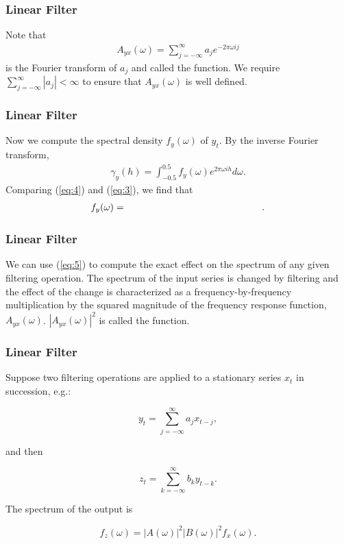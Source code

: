 \documentclass[%
xcolor=pdftex]{beamer}
\begin{document}
\begin{frame}
\frametitle{Linear Filter}

Note that
\begin{eqnarray} \label{eq:res}
A_{yx}(\omega) = \sum^\infty_{j=-\infty} a_j e^{-2\pi \omega i j}
\end{eqnarray}
is the Fourier transform of $a_j$ and called the \underline{\hspace{35 mm}} function. We require $\sum^\infty_{j=-\infty}|a_j|<\infty$ to ensure that
$A_{yx}(\omega)$ is well defined.

\end{frame}

\begin{frame}
\frametitle{Linear Filter}

Now we compute the spectral density $f_y(\omega)$ of $y_t$. By
the inverse Fourier transform,
\begin{eqnarray}\label{eq:4}
\gamma_y(h)  = \int^{0.5}_{-0.5} f_y(\omega) e^{2\pi \omega i h}d\omega.
\end{eqnarray}
Comparing (\ref{eq:4}) and (\ref{eq:3}), we find that
\begin{eqnarray}\label{eq:5}
f_y(\omega)  =  \hspace{50mm}.
\end{eqnarray}


\end{frame}

\begin{frame}
\frametitle{Linear Filter}

We can use (\ref{eq:5}) to compute the exact effect on the spectrum of any given filtering operation. The spectrum of the input series is changed by filtering and the effect of the change is characterized as a frequency-by-frequency multiplication by the squared magnitude of the frequency response function, $A_{yx}(\omega)$. $|A_{yx}(\omega)|^2$ is called the \underline{\hspace{25 mm}} function.

\end{frame}

\begin{frame}
\frametitle{Linear Filter}

Suppose two filtering operations are applied to a stationary series $x_t$ in succession, e.g.:

$$
y_t = \sum_{j=-\infty}^{\infty} a_j x_{t-j},
$$

and then

$$
z_t = \sum_{k=-\infty}^{\infty} b_k y_{t-k}.
$$

The spectrum of the output is

$$
f_z(\omega) = |A(\omega)|^2 |B(\omega)|^2 f_x(\omega).
$$

\end{frame}
\end{document}
